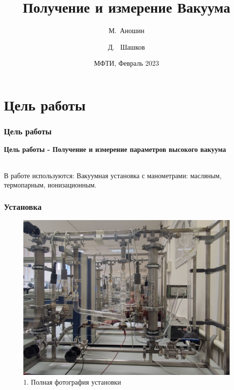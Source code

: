 \documentclass[xcolor=table]{beamer}
\title[Получение и измерение Вакуума] %
{Получение и измерение Вакуума}
\author[Аношин, Шашков] 
{М.~Аношин\inst{1} \and Д. ~Шашков\inst{1}}
\date[11.02.2023] 
{МФТИ, Февраль 2023}
\begin{document}
\frame{\titlepage}

\section{Цель работы}
\begin{frame}\frametitle{Цель работы}
    \large \textbf{Цель работы - Получение и измерение параметров высокого вакуума}  
    
    \large{\\ В работе используются: Вакуумная установка с манометрами: масляным, термопарным, ионизационным.}\\
    \begin{itemize}
        \large \normalsize{}
    \end{itemize}
\end{frame}


\begin{frame}\frametitle{Установка}
    \begin{figure}
        \centering
        \includegraphics[scale=0.2]{images/full.jpg}
        \caption{1. Полная фотография установки}
        \label{fig:my_label}
    \end{figure}
\end{frame}
\end{document}
